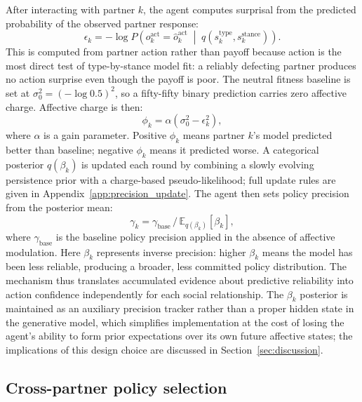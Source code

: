 After interacting with partner $k$, the agent computes surprisal from the predicted probability of the observed partner response:
\begin{equation}
\epsilon_k = -\log P\!\left(o_k^{\text{act}} = \hat{o}_k^{\text{act}} \;\middle|\; q(s_k^{\text{type}}, s_k^{\text{stance}})\right).
\label{eq:epsilon}
\end{equation}
This is computed from partner action rather than payoff because action is the most direct test of type-by-stance model fit: a reliably defecting partner produces no action surprise even though the payoff is poor. The neutral fitness baseline is set at $\sigma_0^2 = (-\log 0.5)^2$, so a fifty-fifty binary prediction carries zero affective charge. Affective charge is then:
\begin{equation}
\phi_k = \alpha\!\left(\sigma_0^2 - \epsilon_k^2\right),
\label{eq:charge}
\end{equation}
where $\alpha$ is a gain parameter. Positive $\phi_k$ means partner $k$'s model predicted better than baseline; negative $\phi_k$ means it predicted worse. A categorical posterior $q(\beta_k)$ is updated each round by combining a slowly evolving persistence prior with a charge-based pseudo-likelihood; full update rules are given in Appendix~\ref{app:precision_update}. The agent then sets policy precision from the posterior mean:
\begin{equation}
\gamma_k = \gamma_{\text{base}} \,/\, \mathbb{E}_{q(\beta_k)}[\beta_k],
\label{eq:gamma_update}
\end{equation}
where $\gamma_{\text{base}}$ is the baseline policy precision applied in the absence of affective modulation. Here $\beta_k$ represents inverse precision: higher $\beta_k$ means the model has been less reliable, producing a broader, less committed policy distribution. The mechanism thus translates accumulated evidence about predictive reliability into action confidence independently for each social relationship. The $\beta_k$ posterior is maintained as an auxiliary precision tracker rather than a proper hidden state in the generative model, which simplifies implementation at the cost of losing the agent's ability to form prior expectations over its own future affective states; the implications of this design choice are discussed in Section~\ref{sec:discussion}.

\subsection{Cross-partner policy selection}

